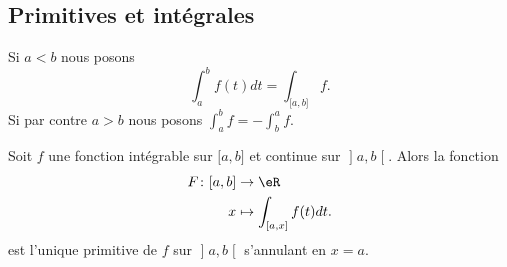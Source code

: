 \subsection{Primitives et intégrales}

\begin{definition}      \label{DEFooGLJDooFeZBBC}
    Si \( a<b\) nous posons
    \begin{equation}
        \int_a^bf(t)dt=\int_{\mathopen[ a , b \mathclose]}f.
    \end{equation}
    Si par contre \( a>b\) nous posons \( \int_a^bf=-\int_b^af\).
\end{definition}

\begin{proposition} \label{PropEZFRsMj}
	Soit \( f\) une fonction intégrable sur \( \mathopen[ a , b \mathclose]\) et continue sur \( \mathopen] a , b \mathclose[\). Alors la fonction
		\begin{equation}
			\begin{aligned}
				F\colon \mathopen[ a , b \mathclose] & \to \eR                                            \\
				x                                    & \mapsto \int_{\mathopen[ a , x \mathclose]}f(t)dt.
			\end{aligned}
		\end{equation}
		est l'unique primitive de \( f\) sur \( \mathopen] a , b \mathclose[\) s'annulant en \( x=a\).
\end{proposition}

